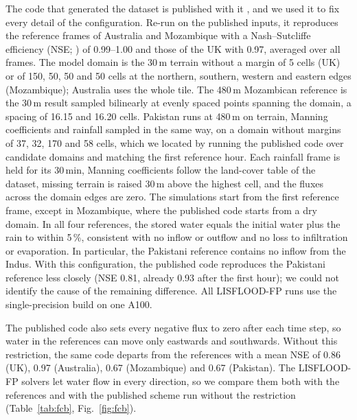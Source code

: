 \documentclass[gmd, manuscript]{copernicus}
\begin{document}
The code that generated the dataset is published with it
\citep{Xu2025floodcastbenchcode}, and we used it to fix every detail of the
configuration. Re-run on the published inputs, it reproduces the reference
frames of Australia and Mozambique with a Nash--Sutcliffe efficiency (NSE;
\citealp{NashSutcliffe1970}) of 0.99--1.00 and those of the UK with 0.97,
averaged over all frames. The model domain is the 30\,m terrain without a
margin of 5 cells (UK) or of 150, 50, 50 and 50 cells at the northern,
southern, western and eastern edges (Mozambique); Australia uses the whole
tile. The 480\,m Mozambican reference is the 30\,m result sampled bilinearly
at evenly spaced points spanning the domain, a spacing of 16.15 and 16.20 cells.
Pakistan runs at 480\,m on terrain, Manning coefficients and rainfall
sampled in the same way, on a domain without margins of 37, 32, 170 and
58 cells, which we located by running the published code over candidate
domains and matching the first reference hour. Each rainfall frame is held
for its 30\,min, Manning coefficients follow the land-cover table of the
dataset, missing terrain is raised 30\,m above the highest cell, and the
fluxes across the domain edges are zero. The simulations start from the
first reference frame, except in Mozambique, where the published code
starts from a dry domain. In all four references, the stored water equals
the initial water plus the rain to within 5\,\%, consistent with no
inflow or outflow and no loss to infiltration or evaporation. In particular, the
Pakistani reference contains no inflow from the Indus. With this
configuration, the published code reproduces the Pakistani reference less
closely (NSE 0.81, already 0.93 after the first hour); we could not identify
the cause of the remaining difference.
All LISFLOOD-FP runs use the single-precision build on one A100.

The published code also sets every negative flux to zero after each time
step, so water in the references can move only eastwards and southwards.
Without this restriction, the same code departs from the references with
a mean NSE of 0.86 (UK), 0.97 (Australia), 0.67 (Mozambique) and 0.67
(Pakistan). The LISFLOOD-FP solvers let water flow in every direction, so
we compare them both with the references and with the published scheme
run without the restriction (Table~\ref{tab:fcb}, Fig.~\ref{fig:fcb}).
\end{document}

